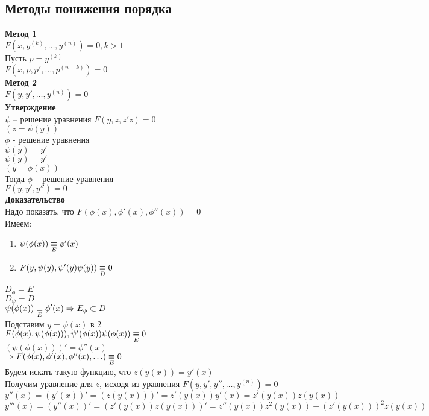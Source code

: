 \documentclass[12pt]{article}
\begin{document}
\subsection{Методы понижения порядка}
\textbf{Метод 1}\\
$F(x, y^{(k)}, \ldots, y^{(n)}) = 0, k > 1$\\
Пусть $p = y^{(k)}$\\
$F(x, p, p', \ldots, p^{(n-k)}) = 0$\\
\textbf{Метод 2}\\
$F(y, y', \ldots, y^{(n)}) = 0$\\
\textbf{Утверждение}\\
$\psi$ -- решение уравнения $F(y, z, z'z) = 0$\\
$(z = \psi(y))$\\
$\phi$ - решение уравнения\\
$\psi(y) = y'$\\
$\psi(y) = y'$\\
$(y=\phi(x))$\\
Тогда $\phi$ -- решение уравнения\\
$F(y, y', y'') = 0$\\
\textbf{Доказательство}\\
Надо показать, что $F(\phi(x), \phi'(x), \phi''(x)) = 0$\\
Имеем:
\begin{enumerate}
    \item $\psi(\phi(x)) \underset E \equiv \phi'(x)$
    \item $F(y, \psi(y), \psi'(y)\psi(y)) \underset D\equiv 0$
\end{enumerate}
$D_\phi = E$\\
$D_\psi = D$\\
$\psi(\phi(x)) \underset E \equiv \phi'(x) \Rightarrow E_\phi \subset D$\\
Подставим $y = \psi(x)$ в 2\\
$F(\phi(x), \psi(\phi(x))), \psi'(\phi(x)) \psi(\phi(x)) \underset E \equiv 0$\\
$(\psi(\phi(x)))' = \phi''(x)$\\
$\Rightarrow F(\phi(x), \phi'(x), \phi''(x), \ldots) \underset E \equiv 0$\\
Будем искать такую функцию, что $z(y(x)) = y'(x)$\\
Получим уравнение для $z$, исходя из уравнения $F(y, y', y'', \ldots, y^{(n)}) = 0$\\
$y''(x) = (y'(x))' = (z(y(x)))' = z'(y(x))y'(x) = z'(y(x))z(y(x))$\\
$y'''(x) = (y''(x))' = (z'(y(x))z(y(x)))' = z''(y(x))z^2(y(x)) + (z'(y(x)))^2z(y(x))$\\
\end{document}
